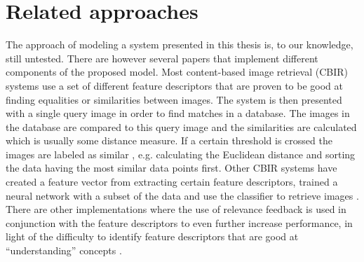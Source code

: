 \section{Related approaches}
\label{sec:method:rel_approaches}
The approach of modeling a system presented in this thesis is, to our knowledge, still untested.
There are however several papers that implement different components of the proposed model.
Most content-based image retrieval (CBIR) systems use a set of different feature descriptors that are proven to be good at finding equalities or similarities between images. The system is then presented with a single query image in order to find matches in a database. The images in the database are compared to this query image and the similarities are calculated which is usually some distance measure. If a certain threshold is crossed the images are labeled as similar \cite{wang2001simplicity}\cite{subrahmanyam2013modified}\cite{nagaraja2015low}, e.g. calculating the Euclidean distance and sorting the data having the most similar  data points first.
Other CBIR systems have created a feature vector from extracting certain feature descriptors, trained a neural network with a subset of the data and use the classifier to retrieve images \cite{elalami2014new}. 
There are other implementations where the use of relevance feedback is used in conjunction with the feature descriptors to even further increase performance, in light of the difficulty to identify feature descriptors that are good at ``understanding'' concepts \cite{wang2015new}. 
